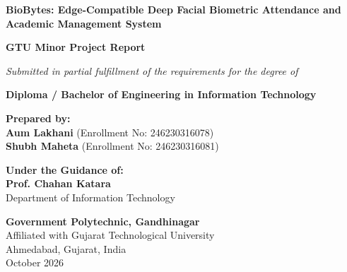 \documentclass[12pt,a4paper,oneside]{report}
\begin{document}
\begin{titlepage}
    \begin{center}
        \vspace*{0.5cm}
        
        \Huge
        \textbf{\textcolor{gtu_blue}{BioBytes: Edge-Compatible Deep Facial Biometric Attendance and Academic Management System}}
        
        \vspace{0.8cm}
        \LARGE
        \textbf{GTU Minor Project Report}
        
        \vspace{1.0cm}
        
        \Large
        \textit{Submitted in partial fulfillment of the requirements for the degree of}
        
        \vspace{0.4cm}
        \textbf{Diploma / Bachelor of Engineering in Information Technology}
        
        \vspace{1.5cm}
        
        \textbf{Prepared by:} \\[0.3cm]
        \textbf{Aum Lakhani} \quad (Enrollment No: 246230316078) \\
        \textbf{Shubh Maheta} \quad (Enrollment No: 246230316081)
        
        \vspace{1.2cm}
        
        \textbf{Under the Guidance of:} \\[0.3cm]
        \textbf{Prof. Chahan Katara} \\
        Department of Information Technology
        
        \vfill
        
        \Large
        \textbf{Government Polytechnic, Gandhinagar} \\
        \normalsize
        Affiliated with Gujarat Technological University \\
        Ahmedabad, Gujarat, India \\
        \vspace{0.4cm}
        October 2026
        
    \end{center}
\end{titlepage}

\end{document}

